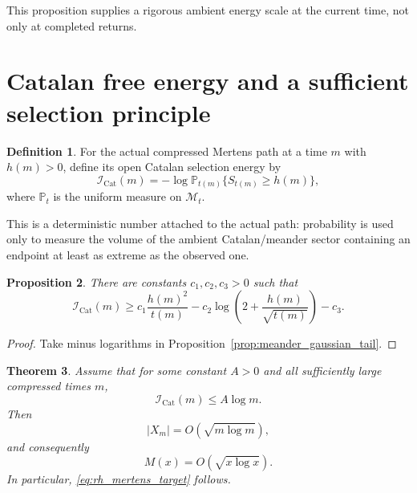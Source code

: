 \documentclass[11pt]{amsart}
\numberwithin{equation}{section}
\theoremstyle{plain}
\newtheorem{theorem}{Theorem}[section]
\newtheorem{proposition}[theorem]{Proposition}
\theoremstyle{definition}
\newtheorem{definition}[theorem]{Definition}
\theoremstyle{remark}
\newcommand{\Mert}{M}
\newcommand{\Pp}{\mathbb{P}}
\newcommand{\Icat}{\mathcal{I}_{\mathrm{Cat}}}
\begin{document}
This proposition supplies a rigorous ambient energy scale at the current time, not only at completed returns.

\section{Catalan free energy and a sufficient selection principle}
\label{sec:catalan_free_energy}

\begin{definition}
\label{def:meander_selection_energy}
For the actual compressed Mertens path at a time $m$ with $h(m)>0$, define its open Catalan selection energy by
\begin{equation}
\Icat(m)
=
-\log
\Pp_{t(m)}\{S_{t(m)}\ge h(m)\},
\label{eq:selection_energy_definition}
\end{equation}
where $\Pp_t$ is the uniform measure on $\mathcal{M}_t$.
\end{definition}

This is a deterministic number attached to the actual path: probability is used only to measure the volume of the ambient Catalan/meander sector containing an endpoint at least as extreme as the observed one.

\begin{proposition}
\label{prop:selection_energy_lower_bound}
There are constants $c_1,c_2,c_3>0$ such that
\begin{equation}
\Icat(m)
\ge
c_1\frac{h(m)^2}{t(m)}
-c_2\log\!\left(2+\frac{h(m)}{\sqrt{t(m)}}\right)
-c_3.
\label{eq:selection_energy_lower_bound}
\end{equation}
\end{proposition}

\begin{proof}
Take minus logarithms in Proposition~\ref{prop:meander_gaussian_tail}.
\end{proof}

\begin{theorem}
\label{thm:selection_energy_implies_rh_scale}
Assume that for some constant $A>0$ and all sufficiently large compressed times $m$,
\begin{equation}
\Icat(m)\le A\log m.
\label{eq:selection_energy_hypothesis}
\end{equation}
Then
\begin{equation}
|X_m|=O\!\left(\sqrt{m\log m}\right),
\label{eq:compressed_sqrtlog_bound}
\end{equation}
and consequently
\begin{equation}
\Mert(x)=O\!\left(\sqrt{x\log x}\right).
\label{eq:mertens_sqrtlog_bound}
\end{equation}
In particular, \eqref{eq:rh_mertens_target} follows.
\end{theorem}
\end{document}

